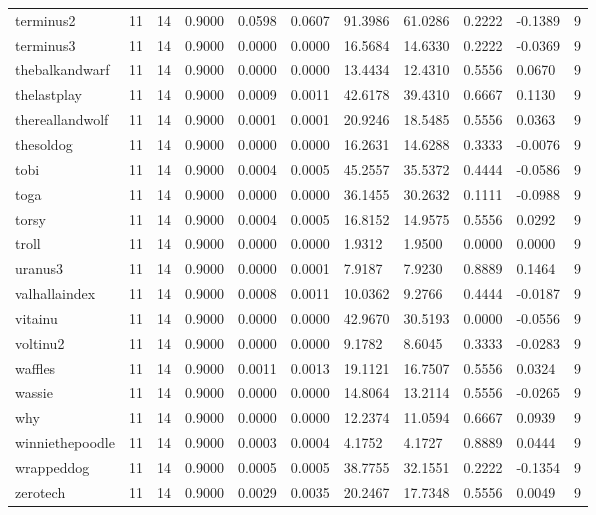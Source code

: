 \begin{table}[htbp]
\begin{tabular}{lllllllllll}
terminus2 & 11 & 14 & 0.9000 & 0.0598 & 0.0607 & 91.3986 & 61.0286 & 0.2222 & -0.1389 & 9 \\
terminus3 & 11 & 14 & 0.9000 & 0.0000 & 0.0000 & 16.5684 & 14.6330 & 0.2222 & -0.0369 & 9 \\
thebalkandwarf & 11 & 14 & 0.9000 & 0.0000 & 0.0000 & 13.4434 & 12.4310 & 0.5556 & 0.0670 & 9 \\
thelastplay & 11 & 14 & 0.9000 & 0.0009 & 0.0011 & 42.6178 & 39.4310 & 0.6667 & 0.1130 & 9 \\
thereallandwolf & 11 & 14 & 0.9000 & 0.0001 & 0.0001 & 20.9246 & 18.5485 & 0.5556 & 0.0363 & 9 \\
thesoldog & 11 & 14 & 0.9000 & 0.0000 & 0.0000 & 16.2631 & 14.6288 & 0.3333 & -0.0076 & 9 \\
tobi & 11 & 14 & 0.9000 & 0.0004 & 0.0005 & 45.2557 & 35.5372 & 0.4444 & -0.0586 & 9 \\
toga & 11 & 14 & 0.9000 & 0.0000 & 0.0000 & 36.1455 & 30.2632 & 0.1111 & -0.0988 & 9 \\
torsy & 11 & 14 & 0.9000 & 0.0004 & 0.0005 & 16.8152 & 14.9575 & 0.5556 & 0.0292 & 9 \\
troll & 11 & 14 & 0.9000 & 0.0000 & 0.0000 & 1.9312 & 1.9500 & 0.0000 & 0.0000 & 9 \\
uranus3 & 11 & 14 & 0.9000 & 0.0000 & 0.0001 & 7.9187 & 7.9230 & 0.8889 & 0.1464 & 9 \\
valhallaindex & 11 & 14 & 0.9000 & 0.0008 & 0.0011 & 10.0362 & 9.2766 & 0.4444 & -0.0187 & 9 \\
vitainu & 11 & 14 & 0.9000 & 0.0000 & 0.0000 & 42.9670 & 30.5193 & 0.0000 & -0.0556 & 9 \\
voltinu2 & 11 & 14 & 0.9000 & 0.0000 & 0.0000 & 9.1782 & 8.6045 & 0.3333 & -0.0283 & 9 \\
waffles & 11 & 14 & 0.9000 & 0.0011 & 0.0013 & 19.1121 & 16.7507 & 0.5556 & 0.0324 & 9 \\
wassie & 11 & 14 & 0.9000 & 0.0000 & 0.0000 & 14.8064 & 13.2114 & 0.5556 & -0.0265 & 9 \\
why & 11 & 14 & 0.9000 & 0.0000 & 0.0000 & 12.2374 & 11.0594 & 0.6667 & 0.0939 & 9 \\
winniethepoodle & 11 & 14 & 0.9000 & 0.0003 & 0.0004 & 4.1752 & 4.1727 & 0.8889 & 0.0444 & 9 \\
wrappeddog & 11 & 14 & 0.9000 & 0.0005 & 0.0005 & 38.7755 & 32.1551 & 0.2222 & -0.1354 & 9 \\
zerotech & 11 & 14 & 0.9000 & 0.0029 & 0.0035 & 20.2467 & 17.7348 & 0.5556 & 0.0049 & 9 \\

\end{tabular}
\end{table}
